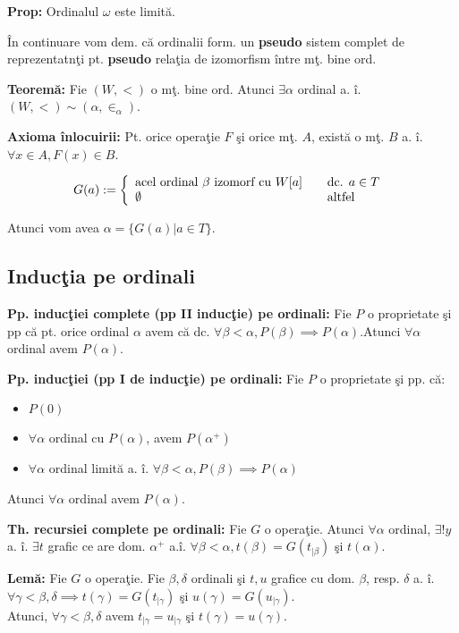 \documentclass{article}
\begin{document}
\textbf{Prop:} Ordinalul $\omega$ este limit\u a.

\^ In continuare vom dem. c\u a ordinalii form. un \textbf{pseudo} sistem complet de reprezentatn\c ti pt. \textbf{pseudo} rela\c tia de izomorfism \^ intre m\c t. bine ord.

\textbf{Teorem\u a:} Fie $(W, <)$ o m\c t. bine ord. Atunci $\exists \alpha$ ordinal a. \^ i. $(W,<)\sim (\alpha,\in_{\alpha})$.

\textbf{Axioma \^ inlocuirii:} Pt. orice opera\c tie $F$ \c si orice m\c t. $A$, exist\u a o m\c t. $B$ a. \^ i. $\forall x\in A, F(x)\in B$.

\[ G(a) := \left\{ \begin{array}{l l} \text{acel ordinal }\beta \text{ izomorf cu } W[a] & \quad \text{dc. $a\in T$ }\\ \emptyset & \quad \text{altfel}\\ \end{array} \right. \]

Atunci vom avea $\alpha=\{G(a)|a\in T\}$.

\subsection{Induc\c tia pe ordinali}

\textbf{Pp. induc\c tiei complete (pp II induc\c tie) pe ordinali:} Fie $P$ o proprietate \c si pp c\u a pt. orice ordinal $\alpha$ avem c\u a dc. $\forall\beta<\alpha, P(\beta) \implies P(\alpha)$.Atunci $\forall \alpha$ ordinal avem $P(\alpha)$.

\textbf{Pp. induc\c tiei (pp I de induc\c tie) pe ordinali:} Fie $P$ o proprietate \c si pp. c\u a:
\begin{itemize}
    \item $P(0)$
    \item $\forall \alpha$ ordinal cu $P(\alpha)$, avem $P(\alpha^+)$
    \item $\forall \alpha$ ordinal limit\u a a. \^ i. $\forall \beta<\alpha, P(\beta) \implies P(\alpha)$
\end{itemize}
Atunci $\forall \alpha$ ordinal avem $P(\alpha)$.

\textbf{Th. recursiei complete pe ordinali:} Fie $G$ o opera\c tie. Atunci $\forall \alpha$ ordinal, $\exists! y$ a. \^ i. $\exists t$ grafic ce are dom. $\alpha^+$ a.\^ i. $\forall \beta<\alpha, t(\beta)=G(t_{|\beta})$ \c si $t(\alpha)$.

\textbf{Lem\u a:} Fie $G$ o opera\c tie. Fie $\beta,\delta$ ordinali \c si $t,u$ grafice cu dom. $\beta$, resp. $\delta$ a. \^i. $\forall \gamma <\beta,\delta \implies t(\gamma)=G(t_{|\gamma})$ \c si $u(\gamma)=G(u_{|\gamma})$.\\
Atunci, $\forall \gamma <\beta,\delta$ avem $t_{|\gamma}=u_{|\gamma}$ \c si $t(\gamma)=u(\gamma)$.
\end{document}
